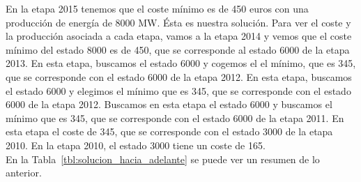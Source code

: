 \documentclass[12pt,a4paper,twoside,openright,titlepage,final]{article}
\begin{document}
En la etapa 2015 tenemos que el coste mínimo es de 450 euros con una producción de energía de 8000 MW. Ésta es nuestra solución. Para ver el coste y la producción asociada a cada etapa, vamos a la etapa 2014 y vemos que el coste mínimo del estado 8000 es de 450, que se corresponde al estado 6000 de la etapa 2013. En esta etapa, buscamos el estado 6000 y cogemos el el mínimo, que es 345, que se corresponde con el estado 6000 de la etapa 2012. En esta etapa, buscamos el estado 6000 y elegimos el mínimo que es 345, que se corresponde con el estado 6000 de la etapa 2012. Buscamos en esta etapa el estado 6000 y buscamos el mínimo que es 345, que se corresponde con el estado 6000 de la etapa 2011. En esta etapa el coste de 345, que se corresponde con el estado 3000 de la etapa 2010. En la etapa 2010, el estado 3000 tiene un coste de 165.\\

En la Tabla~\ref{tbl:solucion_hacia_adelante} se puede ver un resumen de lo anterior.\\
\end{document}
